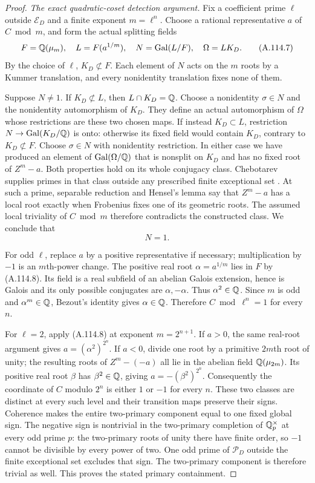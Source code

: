 \begin{proof}
\emph{The exact quadratic-coset detection argument.}
Fix a coefficient prime $\ell$ outside
$\mathcal E_D$ and a finite exponent $m=\ell^n$.
Choose a rational representative $a$ of $C\bmod m$,
and form the actual splitting fields
\[
 F=\mathbb Q(\mu_m),\quad L=F(a^{1/m}),\quad
 N=\operatorname{Gal}(L/F),\quad \Omega=LK_D.
\tag{A.114.7}
\]
By the choice of $\ell$, $K_D\not\subset F$.
Each element of $N$ acts on the $m$ roots by
a Kummer translation, and every nonidentity
translation fixes none of them.

Suppose $N\ne1$.
If $K_D\not\subset L$, then
$L\cap K_D=\mathbb Q$.
Choose a nonidentity $\sigma\in N$ and the
nonidentity automorphism of $K_D$.
They define an actual automorphism of $\Omega$
whose restrictions are these two chosen maps.
If instead $K_D\subset L$, restriction
$N\to\operatorname{Gal}(K_D/\mathbb Q)$ is onto:
otherwise its fixed field would contain $K_D$,
contrary to $K_D\not\subset F$.
Choose $\sigma\in N$ with nonidentity restriction.
In either case we have produced an element of
$\operatorname{Gal}(\Omega/\mathbb Q)$ that is nonsplit
on $K_D$ and has no fixed root of $Z^m-a$.
Both properties hold on its whole conjugacy class.
Chebotarev supplies primes in that class outside
any prescribed finite exceptional set
\cite[Theorem 8.31]{AgentMilneANT}.
At such a prime, separable reduction and Hensel's
lemma say that $Z^m-a$ has a local root exactly
when Frobenius fixes one of its geometric roots.
The assumed local triviality of $C\bmod m$
therefore contradicts the constructed class.
We conclude that
\[
                             N=1.
\tag{A.114.8}
\]

For odd $\ell$, replace $a$ by a positive
representative if necessary; multiplication by
$-1$ is an $m$th-power change.
The positive real root $\alpha=a^{1/m}$ lies
in $F$ by (A.114.8).
Its field is a real subfield of an abelian
Galois extension, hence is Galois and its only
possible conjugates are $\alpha,-\alpha$.
Thus $\alpha^2\in\mathbb Q$.
Since $m$ is odd and $\alpha^m\in\mathbb Q$,
Bezout's identity gives $\alpha\in\mathbb Q$.
Therefore $C\bmod\ell^n=1$ for every $n$.

For $\ell=2$, apply (A.114.8) at exponent
$m=2^{n+1}$.
If $a>0$, the same real-root argument gives
$a=(\alpha^2)^{2^n}$.
If $a<0$, divide one root by a primitive
$2m$th root of unity; the resulting roots of
$Z^m-(-a)$ all lie in the abelian field
$\mathbb Q(\mu_{2m})$.
Its positive real root $\beta$ has
$\beta^2\in\mathbb Q$, giving
$a=-(\beta^2)^{2^n}$.
Consequently the coordinate of $C$ modulo $2^n$
is either $1$ or $-1$ for every $n$.
These two classes are distinct at every such
level and their transition maps preserve their
signs.  Coherence makes the entire two-primary
component equal to one fixed global sign.
The negative sign is nontrivial in the
two-primary completion of $\mathbb Q_p^\times$ at
every odd prime $p$: the two-primary roots of
unity there have finite order, so $-1$ cannot
be divisible by every power of two.
One odd prime of $\mathcal P_D$ outside the
finite exceptional set excludes that sign.
The two-primary component is therefore trivial
as well.
This proves the stated primary containment.


\end{proof}
